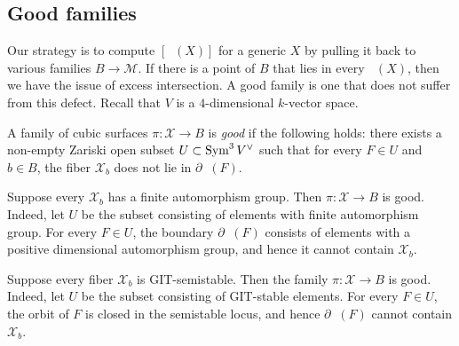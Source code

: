 \documentclass[12pt,reqno]{amsart}
\renewcommand{\k}{k}
\DeclareMathOperator{\Orb}{\overline{Orb}}
\renewcommand{\to}{{\longrightarrow}}
\numberwithin{equation}{section}
\newcommand{\cX}{\mathcal{X}}
\begin{document}
\subsection{Good families}
\label{sec:good-families}
Our strategy is to compute $[\Orb(X)]$ for a generic $X$ by pulling it back to various families $B \to \mathscr M$.
If there is a point of $B$ that lies in every $\Orb(X)$, then we have the issue of excess intersection. 
A good family is one that does not suffer from this defect.
Recall that $V$ is a $4$-dimensional $\k$-vector space.
\begin{definition}
\label{def:goodfamily}
A family of cubic surfaces $\pi \colon \cX \to B$ is \emph{good} if
the following holds: there exists a non-empty Zariski open subset
$U \subset \operatorname{Sym}^3V^\vee$ such that for every $F \in U$ and $b \in B$,
the fiber $\cX_b$ does not lie in $\partial \Orb(F)$.
\end{definition}
\begin{example}
  \label{ex:finaut}
  Suppose every $\cX_b$ has a finite automorphism group.  Then
  $\pi \colon \cX \to B$ is good.  Indeed, let $U$ be the subset
  consisting of elements with finite automorphism group.  For every
  $F \in U$, the boundary $\partial \Orb(F)$ consists of elements with
  a positive dimensional automorphism group, and hence it cannot
  contain $\cX_b$.
\end{example}
\begin{example}
  \label{ex:semistable}
  Suppose every fiber $\cX_b$ is GIT-semistable.
  Then the family $\pi \colon \cX \to B$ is good.
  Indeed, let $U$ be the subset consisting of GIT-stable elements.
  For every $F \in U$, the orbit of $F$ is closed in the semistable locus, and hence $\partial \Orb(F)$ cannot contain $\cX_b$.
\end{example}
\end{document}

